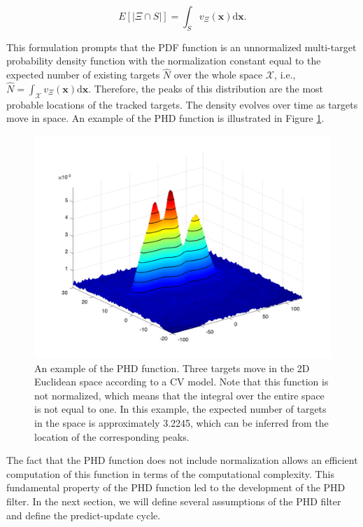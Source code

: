 \begin{equation}\label{eq:phd-func-integral}
    E[| \Xi \cap S |] = \int_S v_\Xi(\mathbf{x}) \mathrm{d} \mathbf{x}.
\end{equation}

This formulation prompts that the PDF function is an unnormalized multi-target probability density function with the normalization constant equal to the expected number of existing targets $\hat{N}$ over the whole space $\mathcal{X}$, i.e., $\hat{N} = \int_\mathcal{X} v_\Xi(\mathbf{x}) \mathrm{d} \mathbf{x}$. Therefore, the peaks of this distribution are the most probable locations of the tracked targets. The density evolves over time as targets move in space. An example of the PHD function is illustrated in Figure \ref{fig:phd-function}.

\begin{figure}
    \centering
    \includegraphics[width=.6\linewidth]{figures/phd-function.png}
    \caption[PHD function example]{An example of the PHD function. Three targets move in the 2D Euclidean space according to a CV model. Note that this function is not normalized, which means that the integral over the entire space is not equal to one. In this example, the expected number of targets in the space is approximately 3.2245, which can be inferred from the location of the corresponding peaks.}
    \label{fig:phd-function}
\end{figure}

The fact that the PHD function does not include normalization allows an efficient computation of this function in terms of the computational complexity. This fundamental property of the PHD function led to the development of the PHD filter. In the next section, we will define several assumptions of the PHD filter and define the predict-update cycle.
